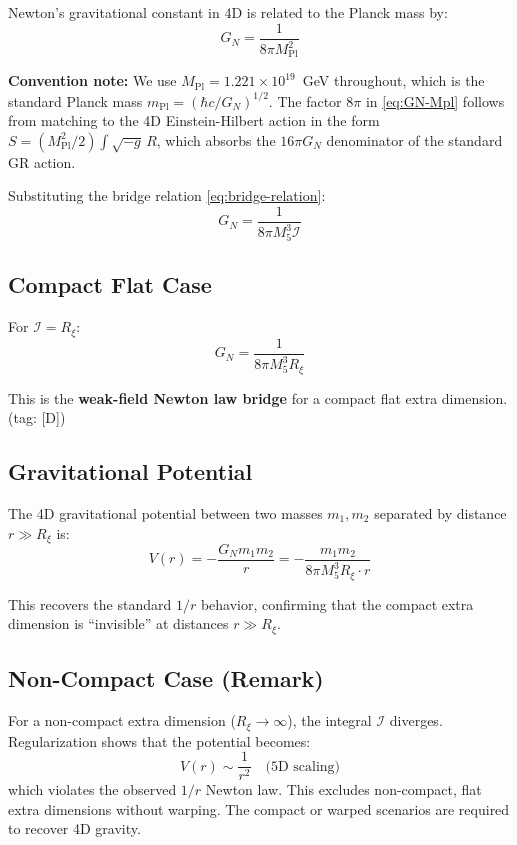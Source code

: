 \documentclass[11pt,a4paper]{article}
\newcommand{\Rxi}{R_\xi}
\newcommand{\Mpl}{M_{\mathrm{Pl}}}
\newcommand{\Mfive}{M_5}
\newcommand{\calI}{\mathcal{I}}
\newcommand{\GN}{G_N}
\begin{document}
Newton's gravitational constant in 4D is related to the Planck mass by:
\begin{equation}
\GN = \frac{1}{8\pi \Mpl^2}
\label{eq:GN-Mpl}
\end{equation}

\noindent\textbf{Convention note:} We use $\Mpl = 1.221 \times 10^{19}$~GeV throughout,
which is the standard Planck mass $m_{\mathrm{Pl}} = (\hbar c / \GN)^{1/2}$.
The factor $8\pi$ in \eqref{eq:GN-Mpl} follows from matching to the 4D Einstein-Hilbert
action in the form $S = (\Mpl^2/2)\int\sqrt{-g}\,R$, which absorbs the $16\pi\GN$
denominator of the standard GR action.

Substituting the bridge relation \eqref{eq:bridge-relation}:
\begin{equation}
\GN = \frac{1}{8\pi \Mfive^3 \calI}
\label{eq:GN-general}
\end{equation}

\subsection{Compact Flat Case}

For $\calI = \Rxi$:
\begin{equation}
\boxed{\GN = \frac{1}{8\pi \Mfive^3 \Rxi}}
\label{eq:GN-compact}
\end{equation}

This is the \textbf{weak-field Newton law bridge} for a compact flat extra
dimension. \hfill (tag: [D])

\subsection{Gravitational Potential}

The 4D gravitational potential between two masses $m_1, m_2$ separated by
distance $r \gg \Rxi$ is:
\begin{equation}
V(r) = -\frac{\GN m_1 m_2}{r} = -\frac{m_1 m_2}{8\pi \Mfive^3 \Rxi \cdot r}
\label{eq:Newton-potential}
\end{equation}

This recovers the standard $1/r$ behavior, confirming that the compact extra
dimension is ``invisible'' at distances $r \gg \Rxi$.

\subsection{Non-Compact Case (Remark)}

For a non-compact extra dimension ($\Rxi \to \infty$), the integral $\calI$
diverges. Regularization shows that the potential becomes:
\begin{equation}
V(r) \sim \frac{1}{r^2} \quad \text{(5D scaling)}
\label{eq:5D-potential}
\end{equation}
which violates the observed $1/r$ Newton law. This excludes non-compact,
flat extra dimensions without warping. The compact or warped scenarios are
required to recover 4D gravity.
\end{document}
